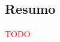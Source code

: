 \vspace*{\fill}

\begin{center}
	\section*{Resumo}
	\textcolor{red}{TODO}
\end{center}

\vspace*{\fill}